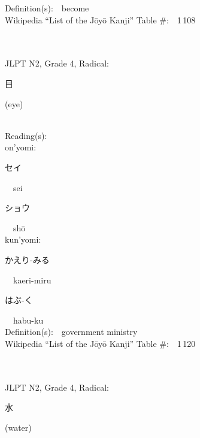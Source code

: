 \begin{multicols}{2}
Definition(s):\ \ become \\
Wikipedia ``List of the J\=oy\=o Kanji'' Table \#:\ \ 1\,108 \\
\ \ \\
{\fontsize{34pt}{40pt}  }\ \ \\  %
{JLPT N2, Grade 4, Radical:\ \ {\begin{CJK}{UTF8}{min} 目 \end{CJK}} (eye) } \\
Reading(s):\ \ \\
{\hspace*{1em}}on'yomi:\ \ \\
{\hspace*{2em}}{\begin{CJK}{UTF8}{min} セイ \end{CJK}}\ \ sei\ \ \\
{\hspace*{2em}}{\begin{CJK}{UTF8}{min} ショウ \end{CJK}}\ \ sh\=o\ \ \\
{\hspace*{1em}}kun'yomi:\ \ \\
{\hspace*{2em}}{\begin{CJK}{UTF8}{min} かえり-みる \end{CJK}}\ \ kaeri-miru\ \ \\
{\hspace*{2em}}{\begin{CJK}{UTF8}{min} はぶ-く \end{CJK}}\ \ habu-ku\ \ \\
Definition(s):\ \ government ministry \\
Wikipedia ``List of the J\=oy\=o Kanji'' Table \#:\ \ 1\,120 \\
\ \ \\
{\fontsize{34pt}{40pt}  }\ \ \\  %
{JLPT N2, Grade 4, Radical:\ \ {\begin{CJK}{UTF8}{min} 水 \end{CJK}} (water) } \\

\end{multicols}
